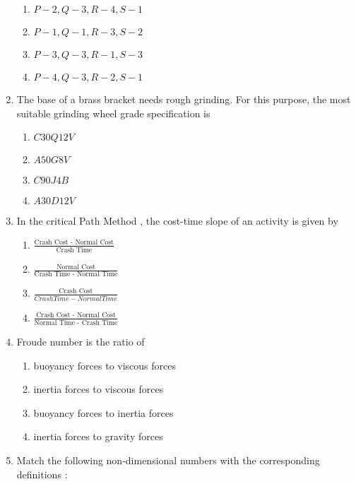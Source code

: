 \documentclass[journal]{IEEEtran}
\begin{document}
\begin{enumerate}
    \begin{enumerate}
        \item $P-2,Q-3,R-4,S-1$
        \item $P-1,Q-1,R-3,S-2$
        \item $P-3,Q-3,R-1,S-3$
        \item $P-4,Q-3,R-2,S-1$
    \end{enumerate}
    \item The base of a brass bracket needs rough grinding. For this purpose, the most suitable grinding wheel grade specification is
    \begin{enumerate}
        \item $C30Q12V$
        \item $A50G8V$
        \item $C90J4B$
        \item $A30D12V$
    \end{enumerate}
    \item In the critical Path Method , the cost-time slope of an activity is given by 
    \begin{enumerate}
        \item $\frac{\text{Crash Cost - Normal Cost}}{\text{Crash Time}}$
        \item $\frac{\text{Normal Cost}}{\text{Crash Time - Normal Time}}$
        \item $\frac{\text{Crash Cost}}{Crash Time - Normal Time}$
        \item $\frac{\text{Crash Cost - Normal Cost}}{\text{Normal Time - Crash Time}}$
    \end{enumerate}
    \item Froude number is the ratio of 
    \begin{enumerate}
        \item buoyancy forces to viscous forces 
        \item inertia forces to viscous forces
        \item buoyancy forces to inertia forces
        \item inertia forces to gravity forces
    \end{enumerate}
    \item Match the following non-dimensional numbers with the corresponding definitions $\colon$
	\begin{table}[H]    
  \centering
  
  \label{tab1.1.9.2}
\end{table}


\end{enumerate}
\end{document}
